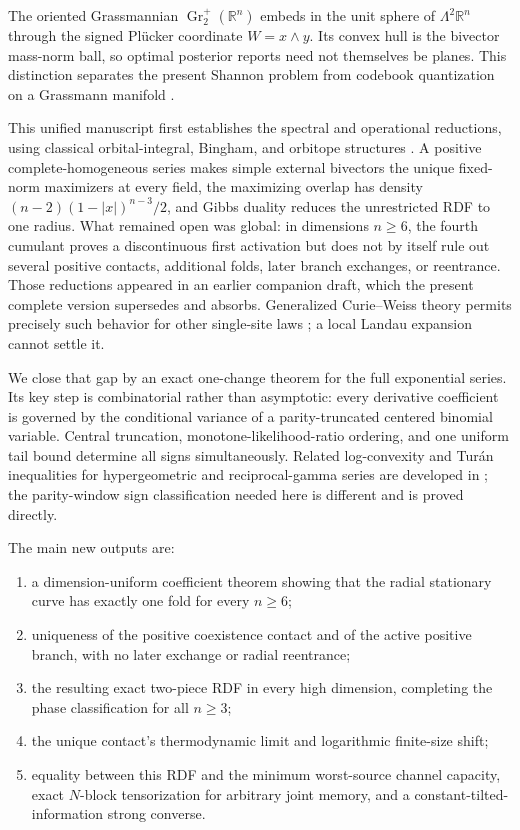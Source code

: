 \documentclass[11pt,a4paper]{article}
\newcommand{\R}{\mathbb R}
\DeclareMathOperator{\Gr}{Gr}
\begin{document}
The oriented Grassmannian $\Gr_2^+(\R^n)$ embeds in the unit sphere of
$\Lambda^2\R^n$ through the signed Pl\"ucker coordinate
$W=x\wedge y$.  Its convex hull is the bivector mass-norm ball, so optimal
posterior reports need not themselves be planes.  This distinction separates
the present Shannon problem from codebook quantization on a Grassmann
manifold \cite{DaiLiuRider2008,RieglerKolianderBolcskei2023,RiasatMahdavifar2026}.

This unified manuscript first establishes the spectral and operational
reductions, using classical orbital-integral, Bingham, and orbitope structures
\cite{HarishChandra1957,McSwiggen2019,Downs1972,KhatriMardia1977}.  A positive
complete-homogeneous series makes simple external bivectors the unique
fixed-norm maximizers at every field, the maximizing overlap has density
$(n-2)(1-|x|)^{n-3}/2$, and Gibbs duality reduces the unrestricted RDF to one
radius.  What remained open was global: in dimensions $n\ge6$, the fourth
cumulant proves a discontinuous first activation but does not by itself rule
out several positive contacts, additional folds, later branch exchanges, or
reentrance.  Those reductions appeared in an earlier companion draft, which
the present complete version supersedes and absorbs.  Generalized Curie--Weiss theory permits
precisely such behavior for other single-site laws
\cite{EllisNewman1978,EllisNewmanLimits1978,EiseleEllis1988,Hou2026}; a local
Landau expansion cannot settle it.

We close that gap by an exact one-change theorem for the full exponential
series.  Its key step is combinatorial rather than asymptotic: every derivative
coefficient is governed by the conditional variance of a parity-truncated
centered binomial variable.  Central truncation, monotone-likelihood-ratio
ordering, and one uniform tail bound determine all signs simultaneously.
Related log-convexity and Tur\'an inequalities for hypergeometric and
reciprocal-gamma series are developed in
\cite{KarpSitnik2010,KalmykovKarp2017}; the parity-window sign classification
needed here is different and is proved directly.

The main new outputs are:
\begin{enumerate}
\item a dimension-uniform coefficient theorem showing that the radial
stationary curve has exactly one fold for every $n\ge6$;
\item uniqueness of the positive coexistence contact and of the active
positive branch, with no later exchange or radial reentrance;
\item the resulting exact two-piece RDF in every high dimension, completing
the phase classification for all $n\ge3$;
\item the unique contact's thermodynamic limit and logarithmic finite-size
shift;
\item equality between this RDF and the minimum worst-source channel
capacity, exact $N$-block tensorization for arbitrary joint memory, and a
constant-tilted-information strong converse.
\end{enumerate}
\end{document}
